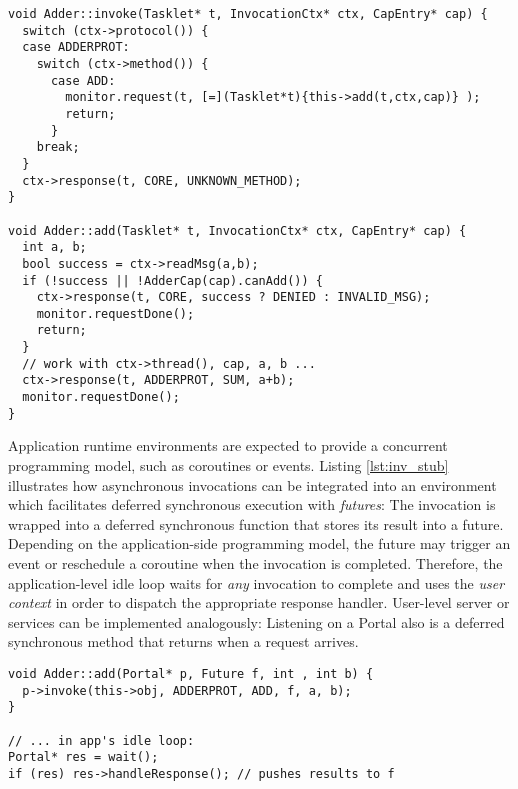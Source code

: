 \begin{lstlisting}[float, label=lst:inv_skel, caption=Kernel-side dispatch and implementation of a method invocation.]
void Adder::invoke(Tasklet* t, InvocationCtx* ctx, CapEntry* cap) {
  switch (ctx->protocol()) {
  case ADDERPROT:
    switch (ctx->method()) {
      case ADD: 
        monitor.request(t, [=](Tasklet*t){this->add(t,ctx,cap)} );
        return;
      }
    break;
  }
  ctx->response(t, CORE, UNKNOWN_METHOD);
}

void Adder::add(Tasklet* t, InvocationCtx* ctx, CapEntry* cap) {
  int a, b;
  bool success = ctx->readMsg(a,b);
  if (!success || !AdderCap(cap).canAdd()) {
  	ctx->response(t, CORE, success ? DENIED : INVALID_MSG); 
  	monitor.requestDone();
  	return;
  }
  // work with ctx->thread(), cap, a, b ...
  ctx->response(t, ADDERPROT, SUM, a+b);
  monitor.requestDone();
}
\end{lstlisting}

Application runtime environments are expected to provide a concurrent programming model, such as coroutines or events. Listing \ref{lst:inv_stub} illustrates how asynchronous invocations can be integrated into an environment which facilitates deferred synchronous execution with \emph{futures}: The invocation is wrapped into a deferred synchronous function that stores its result into a future. Depending on the application-side programming model, the future may trigger an event or reschedule a coroutine when the invocation is completed. Therefore, the application-level idle loop waits for \emph{any} invocation to complete and uses the \emph{user context}  in order to dispatch the appropriate response handler. User-level server or services can be implemented analogously: Listening on a Portal also is a deferred synchronous method that returns when a request arrives.

\begin{lstlisting}[float, label=lst:inv_stub, caption=Example for issuing invocation user-side.]
void Adder::add(Portal* p, Future f, int , int b) {
  p->invoke(this->obj, ADDERPROT, ADD, f, a, b); 
}

// ... in app's idle loop:
Portal* res = wait();
if (res) res->handleResponse(); // pushes results to f
\end{lstlisting}

\FloatBarrier




